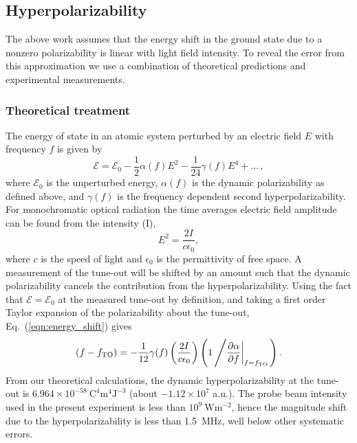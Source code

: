 \documentclass[%
 amsmath,amssymb,
aps,
]{revtex4-2}
\begin{document}
\subsection{Hyperpolarizability}
The above work assumes that the energy shift in the ground state due to a nonzero polarizability is linear with light field intensity. To reveal the error from this approximation we use a combination of theoretical predictions and experimental measurements.
\subsubsection{Theoretical treatment}
The energy of state in an atomic system perturbed by an electric field \(E\) with frequency \(f\) is given by 
\begin{equation}
\mathcal{E}=\mathcal{E}_0 - \frac{1}{2} \alpha(f) E^2 - \frac{1}{24} \gamma(f) E^4 + \ldots \, , \label{eqn:energy_shift}
\end{equation}
where \(\mathcal{E}_0\) is the unperturbed energy, \(\alpha(f)\) is the dynamic polarizability as defined above, and \(\gamma(f)\) is the frequency dependent second hyperpolarizability.  For monochromatic optical radiation the time averages electric field amplitude can be found from the intensity (I),
\begin{equation}
    E^2=\frac{2 I}{c \epsilon_0},
\end{equation}
where \(c\) is the speed of light and \(\epsilon_0\) is the permittivity of free space. A measurement of the tune-out will be shifted by an amount such that the dynamic polarizability cancels the contribution from the hyperpolarizability. Using the fact that \(\mathcal{E}=\mathcal{E}_0\) at the measured tune-out by definition, and taking a first order Taylor expansion of the polarizability about the tune-out, Eq.~(\ref{eqn:energy_shift}) gives 
\begin{equation}
 (f-f_\mathrm{TO} ) = - \frac{1}{12} \gamma(f) \left(\frac{2 I}{c \epsilon_0}\right) \left(1\left/ \frac{\partial\alpha}{\partial f}\bigg|_{f=f_\mathrm{TO}} \right. \right).
\end{equation}
From our theoretical calculations, the dynamic hyperpolarizability at the tune-out is \(6.964\times10^{-58}\: \mathrm{C}^4\mathrm{m}^4\mathrm{J}^{-3}\) (about $-1.12\times10^{7}$ a.u.). The probe beam intensity used in the present experiment is less than $10^{9}\: \mathrm{W} \mathrm{m}^{-2}$, hence the magnitude shift due to the hyperpolarizability is less than 1.5~MHz, well below other systematic errors.
\end{document}
